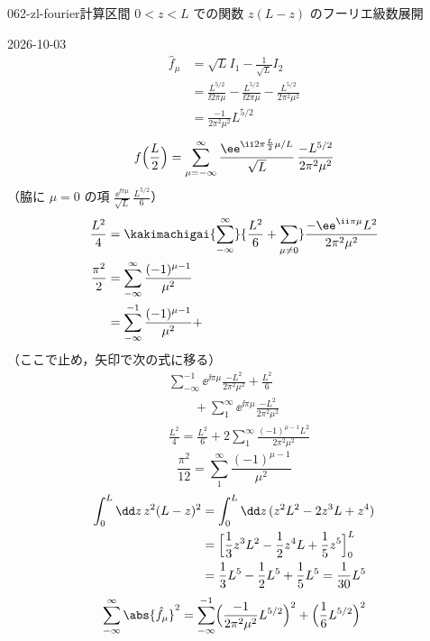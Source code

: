 \documentclass[uplatex,dvipdfmx,a4paper,11pt]{jsarticle}
\begin{document}
\begin{mondai}{062-zl-fourier}{計算}{区間 $0<z<L$ での関数 $z(L-z)$ のフーリエ級数展開}
\begin{kotaeutsushi}{2026-10-03}
\begin{align*}
  \hat{f}_{\mu}&=\sqrt{L}I_1-\frac{1}{\sqrt{L}}I_2\\
  &=\frac{L^{5/2}}{\ii2\pi\mu}-\frac{L^{5/2}}{\ii2\pi\mu}-\frac{L^{5/2}}{2\pi^{2}\mu^{2}}\\
  &=\frac{-1}{2\pi^{2}\mu^{2}}L^{5/2}
\end{align*}
\[
  f\Bigl(\frac{L}{2}\Bigr)=\sum_{\mu=-\infty}^{\infty}\frac{\ee^{\ii2\pi\frac{L}{2}\mu/L}}{\sqrt{L}}\,\frac{-L^{5/2}}{2\pi^{2}\mu^{2}}
\]
（脇に $\mu=0$ の項 $\frac{\ee^{\ii\pi\mu}}{\sqrt{L}}\,\frac{L^{5/2}}{6}$）
\begin{align*}
  \frac{L^{2}}{4}&=\kakimachigai{\sum_{-\infty}^{\infty}}{\frac{L^{2}}{6}+\sum_{\mu\neq0}}\frac{-\ee^{\ii\pi\mu}L^{2}}{2\pi^{2}\mu^{2}}\\
  \frac{\pi^{2}}{2}&=\sum_{-\infty}^{\infty}\frac{(-1)^{\mu-1}}{\mu^{2}}\\
  &=\sum_{-\infty}^{-1}\frac{(-1)^{\mu-1}}{\mu^{2}}+
\end{align*}
（ここで止め，矢印で次の式に移る）
\begin{align*}
  &\sum_{-\infty}^{-1}\ee^{\ii\pi\mu}\frac{-L^{2}}{2\pi^{2}\mu^{2}}+\frac{L^{2}}{6}\\
  &\qquad+\sum_{1}^{\infty}\ee^{\ii\pi\mu}\frac{-L^{2}}{2\pi^{2}\mu^{2}}\\
  &\frac{L^{2}}{4}=\frac{L^{2}}{6}+2\sum_{1}^{\infty}\frac{(-1)^{\mu-1}L^{2}}{2\pi^{2}\mu^{2}}
\end{align*}
\[
  \frac{\pi^{2}}{12}=\sum_{1}^{\infty}\frac{(-1)^{\mu-1}}{\mu^{2}}
\]
\begin{align*}
  \int_{0}^{L}\dd z\,z^{2}(L-z)^{2}&=\int_{0}^{L}\dd z\,(z^{2}L^{2}-2z^{3}L+z^{4})\\
  &=\Bigl[\frac{1}{3}z^{3}L^{2}-\frac{1}{2}z^{4}L+\frac{1}{5}z^{5}\Bigr]_{0}^{L}\\
  &=\frac{1}{3}L^{5}-\frac{1}{2}L^{5}+\frac{1}{5}L^{5}=\frac{1}{30}L^{5}
\end{align*}
\begin{align*}
  \sum_{-\infty}^{\infty}\abs{\hat{f}_{\mu}}^{2}&=\sum_{-\infty}^{-1}\Bigl(\frac{-1}{2\pi^{2}\mu^{2}}L^{5/2}\Bigr)^{2}+\Bigl(\frac{1}{6}L^{5/2}\Bigr)^{2}\\

\end{align*}
\end{kotaeutsushi}
\end{mondai}
\end{document}
